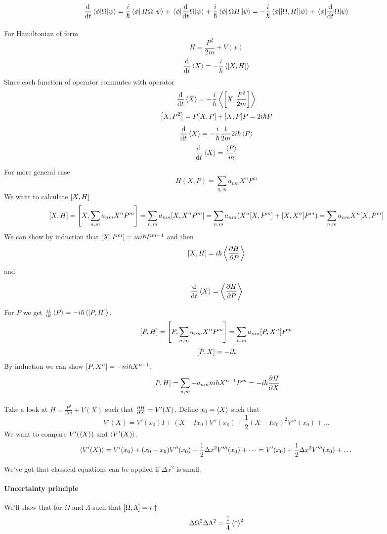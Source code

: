 $$\dv{t} \mel{\phi}{\Omega}{\psi}  = \frac{i}{\hbar} \bra{\phi} H \Omega \ket{\psi} + \mel{\phi}{\dv{t}\Omega}{\psi} +  \frac{i}{\hbar}\bra{\phi} \Omega H\ket{\psi} =-\frac{i}{\hbar} \mel{\phi}{\comm{\Omega}{H}}{\psi} + \mel{\phi}{\dv{t}\Omega}{\psi} $$
\paragraph{}
For Hamiltonian of form
$$H = \frac{P^2}{2m} + V(x)$$
$$\dv{t}\expval{X} = -\frac{i}{\hbar} \expval{\comm{X}{H}}$$
Since each function of operator commutes with operator
$$\dv{t}\expval{X} = -\frac{i}{\hbar} \expval{\comm{X}{\frac{P^2}{2m}}}$$
$$\comm{X}{P^2} =P\comm{X}{P} + \comm{X}{P}P = 2i\hbar P$$
$$\dv{t} \expval{X} = -\frac{i}{\hbar} \frac{1}{2m} 2i\hbar \expval{P} $$
$$\dv{t} \expval{X} =  \frac{\expval{P}}{m}   $$

For more general case
$$H(X,P) = \sum_{n,m} a_{nm} X^nP^m$$
We want to calculate $\comm{X}{H}$
$$\comm{X}{H} = \comm{X}{\sum_{n,m} a_{nm} X^nP^m} = \sum_{n,m} a_{nm}\comm{X}{ X^nP^m} = \sum_{n,m} a_{nm}\qty(X^n\comm{X}{ P^m}+\comm{X}{X^n }P^m)  = \sum_{n,m} a_{nm}X^n\comm{X}{ P^m}$$
We can show by induction that $\comm{X}{ P^m} = mi\hbar P^{m-1}$ and then
$$\comm{X}{H} =  i\hbar  \expval{\pdv{H}{P}}$$
and

$$\dv{t} \expval{X} =  \expval{\pdv{H}{P}} $$

For $P$ we get $\dv{t} \expval{P} = -i\hbar \expval{\comm{P}{H}}$.
$$\comm{P}{H} = \comm{P}{\sum_{n,m} a_{nm} X^nP^m} = \sum_{n,m} a_{nm}\comm{P}{ X^n}P^m$$
$$\comm{P}{X} = -i\hbar$$
By induction we can show $\comm{P}{X^n} = -ni\hbar X^{n-1}$.
$$\comm{P}{H} = \sum_{n,m} -a_{nm}ni\hbar X^{n-1}P^m = -i\hbar \pdv{H}{X}$$
\paragraph{} Take a look at $H = \frac{P^2}{2m} + V(X)$ such that $\pdv{H}{X} = V'(X)$. Define $x_0 = \expval{X}$ such that
$$V'(X) = V'(x_0) I + (X-Ix_0)V''(x_0) + \frac{1}{2}(X-Ix_0)^2V'''(x_0) + \dots$$
We want to compare $V'(\expval{X})$ and $\expval{V'(X)}$.
$$\expval{V'(X)} = V'(x_0) + (x_0-x_0)V''(x_0) + \frac{1}{2} \Delta x^2 V'''(x_0)+\dots = V'(x_0) +\frac{1}{2} \Delta x^2 V'''(x_0)+\dots$$

We've got that classical equations can be applied if $\Delta x^2$ is small.
\paragraph{Uncertainty principle}
We'll show that for $\Omega$ and $\Lambda$ such that $\comm{\Omega}{\Lambda} = i \uparrow$ 
$$\Delta \Omega^2 \Delta \Lambda^2 = \frac{1}{4} \expval{\uparrow}^2$$